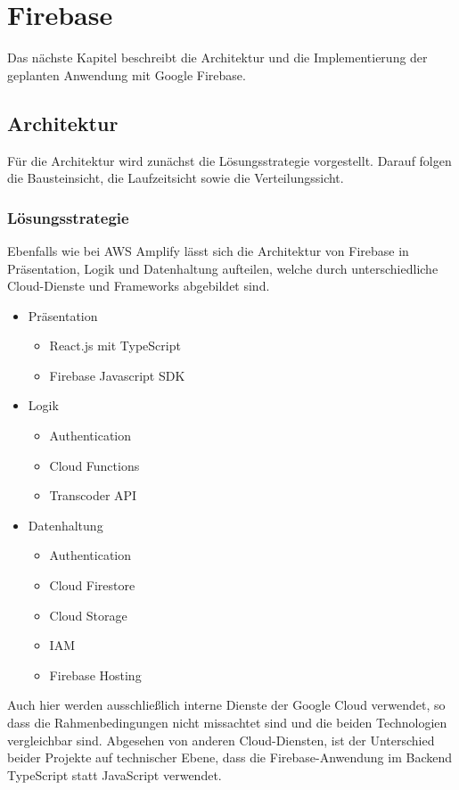 \chapter{Firebase}
\label{kap5}

Das nächste Kapitel beschreibt die Architektur und die Implementierung der geplanten Anwendung mit Google Firebase.

\section{Architektur}

Für die Architektur wird zunächst die Lösungsstrategie vorgestellt. Darauf folgen die Bausteinsicht, die Laufzeitsicht sowie die Verteilungssicht.

\subsection{Lösungsstrategie}

Ebenfalls wie bei \ac{AWS} Amplify lässt sich die Architektur von Firebase in Präsentation, Logik und Datenhaltung aufteilen, welche durch unterschiedliche Cloud-Dienste und Frameworks abgebildet sind.
\begin{itemize}
  \item Präsentation
    \begin{itemize}
      \item React.js mit TypeScript
      \item Firebase Javascript SDK
    \end{itemize}
  \item Logik
    \begin{itemize}
      \item Authentication
      \item Cloud Functions
      \item Transcoder API
    \end{itemize}
  \item Datenhaltung
    \begin{itemize}
      \item Authentication
      \item Cloud Firestore
      \item Cloud Storage
      \item IAM
      \item Firebase Hosting
    \end{itemize}
\end{itemize}

Auch hier werden ausschließlich interne Dienste der Google Cloud verwendet, so dass die Rahmenbedingungen nicht missachtet sind und die beiden Technologien vergleichbar sind. Abgesehen von anderen Cloud-Diensten, ist der Unterschied beider Projekte auf technischer Ebene, dass die Firebase-Anwendung im Backend TypeScript statt JavaScript verwendet.

